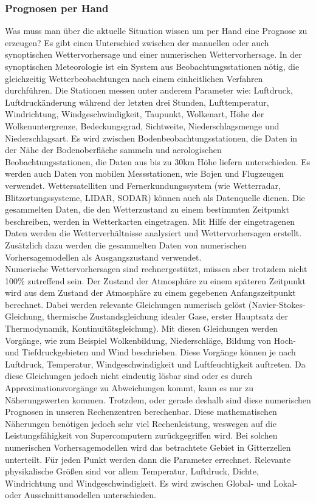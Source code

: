 \subsubsection{Prognosen per Hand} %
Was muss man über die aktuelle Situation wissen um per Hand eine Prognose zu erzeugen?
Es gibt einen Unterschied zwischen der manuellen oder auch synoptischen Wettervorhersage und einer numerischen Wettervorhersage.
In der synoptischen Meteorologie ist ein System aus Beobachtungsstationen nötig, die gleichzeitig Wetterbeobachtungen nach einem einheitlichen Verfahren durchführen.
Die Stationen messen unter anderem Parameter wie:
Luftdruck, Luftdruckänderung während der letzten drei Stunden, Lufttemperatur, Windrichtung, Windgeschwindigkeit, Taupunkt, Wolkenart, Höhe der Wolkenuntergrenze, Bedeckungsgrad, Sichtweite, Niederschlagsmenge und Niederschlagsart.
Es wird zwischen Bodenbeobachtungsstationen, die Daten in der Nähe der Bodenoberfläche sammeln und aerologischen Beobachtungsstationen, die Daten aus bis zu 30km Höhe liefern unterschieden.
Es werden auch Daten von mobilen Messstationen, wie Bojen und Flugzeugen verwendet.
Wettersatelliten und Fernerkundungssystem (wie Wetterradar, Blitzortungssysteme, LIDAR, SODAR) können auch als Datenquelle dienen.
Die gesammelten Daten, die den Wetterzustand zu einem bestimmten Zeitpunkt beschreiben, werden in Wetterkarten eingetragen.
Mit Hilfe der eingetragenen Daten werden die Wetterverhältnisse analysiert und Wettervorhersagen erstellt.
Zusätzlich dazu werden die gesammelten Daten von numerischen Vorhersagemodellen als Ausgangszustand verwendet. %
\\
Numerische Wettervorhersagen sind rechnergestützt, müssen aber trotzdem nicht 100\% zutreffend sein.
Der Zustand der Atmosphäre zu einem späteren Zeitpunkt wird aus dem Zustand der Atmosphäre zu einem gegebenen Anfangszeitpunkt berechnet.
Dabei werden relevante Gleichungen numerisch gelöst
(Navier-Stokes-Gleichung, thermische Zustandsgleichung idealer Gase, erster Hauptsatz der Thermodynamik, Kontinuitätsgleichung).
Mit diesen Gleichungen werden Vorgänge, wie zum Beispiel Wolkenbildung, Niederschläge, Bildung von Hoch- und Tiefdruckgebieten und Wind beschrieben.
Diese Vorgänge können je nach Luftdruck, Temperatur, Windgeschwindigkeit und Luftfeuchtigkeit auftreten.
Da diese Gleichungen jedoch nicht eindeutig lösbar sind oder es durch Approximationsvorgänge zu Abweichungen kommt, kann es nur zu Näherungswerten kommen.
Trotzdem, oder gerade deshalb sind diese numerischen Prognosen in unseren Rechenzentren berechenbar.
Diese mathematischen Näherungen benötigen jedoch sehr viel Rechenleistung,
weswegen auf die Leistungsfähigkeit von Supercomputern zurückgegriffen wird.
Bei solchen numerischen Vorhersagemodellen wird das betrachtete Gebiet in Gitterzellen unterteilt.
Für jeden Punkt werden dann die Parameter errechnet.
Relevante physikalische Größen sind vor allem Temperatur, Luftdruck, Dichte, Windrichtung und Windgeschwindigkeit.
Es wird zwischen Global- und Lokal- oder Ausschnittsmodellen unterschieden.

